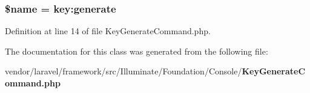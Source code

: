 \subsubsection[{\$name}]{\setlength{\rightskip}{0pt plus 5cm}\${\bf name} = \textquotesingle{}key\+:generate\textquotesingle{}\hspace{0.3cm}{\ttfamily [protected]}}\label{class_illuminate_1_1_foundation_1_1_console_1_1_key_generate_command_ab2fc40d43824ea3e1ce5d86dee0d763b}


Definition at line 14 of file Key\+Generate\+Command.\+php.



The documentation for this class was generated from the following file\+:\begin{DoxyCompactItemize}
\item 
vendor/laravel/framework/src/\+Illuminate/\+Foundation/\+Console/{\bf Key\+Generate\+Command.\+php}\end{DoxyCompactItemize}
